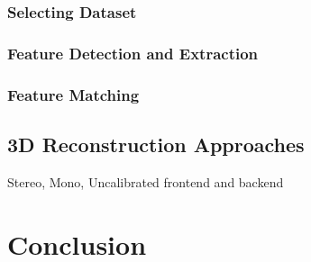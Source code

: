 \subsection*{Selecting Dataset}
\subsection*{Feature Detection and Extraction}
\subsection*{Feature Matching}
\section{3D Reconstruction Approaches}
Stereo, Mono, Uncalibrated
frontend and backend

\chapter{Conclusion}
\label{chapter:conclusion}

